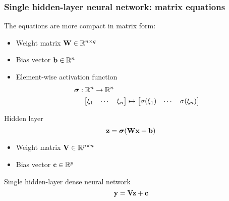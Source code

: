 \begin{frame}
    \frametitle{Single hidden-layer neural network: matrix equations}

    The equations are more compact in matrix form:
    \begin{itemize}
        \item Weight matrix $\mathbf{W} \in \mathbb{R}^{n \times q}$
        \item Bias vector $\mathbf{b} \in \mathbb{R}^n$
        \item Element-wise activation function
        \begin{align*}
            \bm{\sigma} &: \mathbb{R}^n \to \mathbb{R}^n \\
            &\hspace{1.25ex} \begin{bmatrix} \xi_1 & \cdots & \xi_n \end{bmatrix} \mapsto
            \begin{bmatrix} \sigma(\xi_1) & \cdots & \sigma(\xi_n) \end{bmatrix}
        \end{align*}
    \end{itemize}

    \begin{block}{Hidden layer}
        \begin{equation*}
            \mathbf{z} = \bm{\sigma}(\mathbf{W} \mathbf{x} + \mathbf{b})
        \end{equation*}
    \end{block}
    \pause

    \begin{itemize}
        \item Weight matrix $\mathbf{V} \in \mathbb{R}^{p \times n}$
        \item Bias vector $\mathbf{c} \in \mathbb{R}^p$
    \end{itemize}

    \begin{block}{Single hidden-layer dense neural network}
        \begin{equation*}
            \mathbf{y} = \mathbf{V} \mathbf{z} + \mathbf{c}
        \end{equation*}
    \end{block}
\end{frame}

